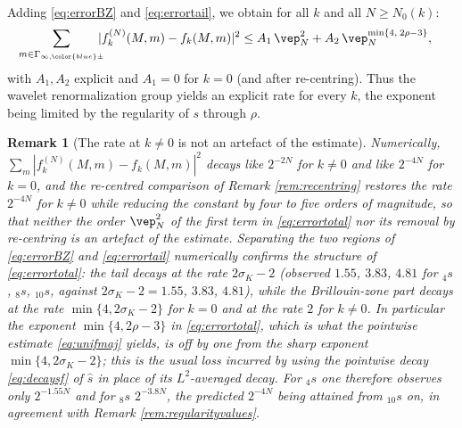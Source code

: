 \documentclass[a4paper, 11pt]{article}
\DeclareMathOperator{\1}{\mathds{1}}
\newtheorem{rem}[thm]{Remark}
\begin{document}
Adding \eqref{eq:errorBZ} and \eqref{eq:errortail}, we obtain for all $k$ and all $N\geq N_{0}(k)$:
\begin{align}
\label{eq:errortotal}
\sum_{m\in\Gamma_{\infty,{\color{blue}\pm}}}\!\!\!\!|f^{(N)}_{k}(M,m)-f_{k}(M,m)|^{2} & \leq A_{1}\!\ \vep_{N}^{2}+A_{2}\!\ \vep_{N}^{\min\{4,\!\ 2\rho-3\}},
\end{align}
with $A_{1},A_{2}$ explicit and $A_{1}=0$ for $k=0$ (and after re-centring). Thus the wavelet renormalization group yields an explicit rate for every $k$, the exponent being limited by the regularity of $s$ through $\rho$.

\begin{rem}[The rate at $k\neq0$ is not an artefact of the estimate]
\label{rem:errorrates}
Numerically, $\sum_{m}|f^{(N)}_{k}(M,m)-f_{k}(M,m)|^{2}$ decays like $2^{-2N}$ for $k\neq0$ and like $2^{-4N}$ for $k=0$, and the re-centred comparison of Remark \ref{rem:recentring} restores the rate $2^{-4N}$ for $k\neq0$ while reducing the constant by four to five orders of magnitude, so that neither the order $\vep_{N}^{2}$ of the first term in \eqref{eq:errortotal} nor its removal by re-centring is an artefact of the estimate. Separating the two regions of \eqref{eq:errorBZ} and \eqref{eq:errortail} numerically confirms the structure of \eqref{eq:errortotal}: the tail decays at the rate $2\sigma_{K}-2$ (observed $1.55$, $3.83$, $4.81$ for $_{4}s$, $_{8}s$, $_{10}s$, against $2\sigma_{K}-2 = 1.55$, $3.83$, $4.81$), while the Brillouin-zone part decays at the rate $\min\{4,2\sigma_{K}-2\}$ for $k=0$ and at the rate $2$ for $k\neq0$. In particular the exponent $\min\{4,2\rho-3\}$ in \eqref{eq:errortotal}, which is what the pointwise estimate \eqref{eq:unifmaj} yields, is off by one from the sharp exponent $\min\{4,2\sigma_{K}-2\}$; this is the usual loss incurred by using the pointwise decay \eqref{eq:decaysf} of $\hat{s}$ in place of its $L^{2}$-averaged decay. For $_{4}s$ one therefore observes only $2^{-1.55N}$ and for $_{8}s$ $2^{-3.8N}$, the predicted $2^{-4N}$ being attained from $_{10}s$ on, in agreement with Remark \ref{rem:regularityvalues}.
\end{rem}
\end{document}

